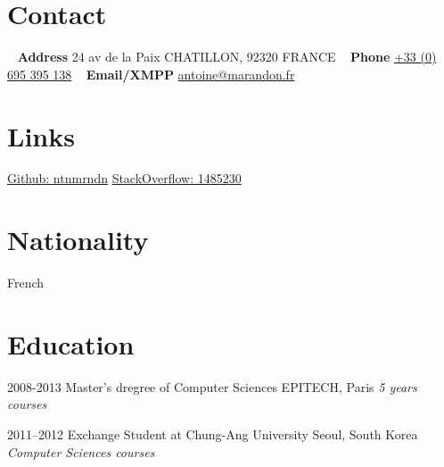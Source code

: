 \documentclass[]{template/friggeri-cv} %
\begin{document}


\begin{aside} %
\section{Contact}
~
\textbf{Address}
24 av de la Paix
CHATILLON, 92320
FRANCE
~
\textbf{Phone}
\href{tel:0033695395169}{+33 (0) 695 395 138}
~
\textbf{Email/XMPP}
\href{mailto:antoine@marandon.fr}{antoine@marandon.fr}
\section {Links}
\href{https://github.com/ntnmrndn}{Github: ntnmrndn}
\href{http://stackoverflow.com/users/1485230/}{StackOverflow: 1485230}
~
\section{Nationality}
French
\end{aside}


\section{Education}

\begin{entrylist}


\entry
{2008-2013}
{Master's dregree {\normalfont of Computer Sciences}}
{EPITECH, Paris}
{\emph{5 years courses}}


\entry
{2011--2012}
{Exchange Student {\normalfont at Chung-Ang University}}
{Seoul, South Korea}
{\emph{Computer Sciences courses}}


\end{entrylist}
\end{document}

